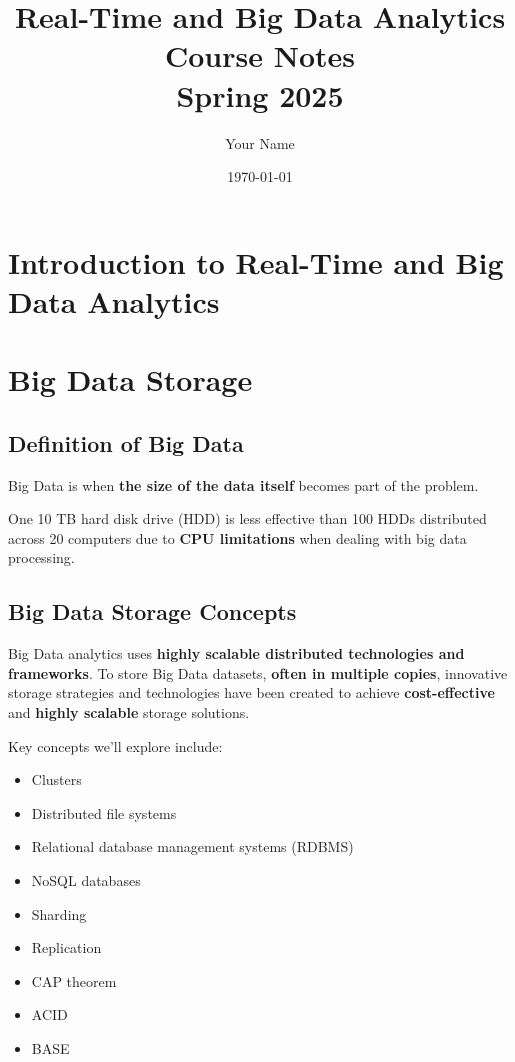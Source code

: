 \documentclass[12pt,a4paper]{report}
\title{
  \Huge{\textbf{Real-Time and Big Data Analytics}} \\
  \vspace{0.5cm}
  \Large{Course Notes} \\
  \vspace{0.5cm}
  \large{Spring 2025}
}
\author{Your Name}
\date{\today}
\begin{document}
\maketitle
\tableofcontents

\chapter{Introduction to Real-Time and Big Data Analytics}

\chapter{Big Data Storage}
\section{Definition of Big Data}
Big Data is when \textbf{the size of the data itself} becomes part of the problem.

\begin{keyconcept}
One 10 TB hard disk drive (HDD) is less effective than 100 HDDs distributed across 20 computers due to \textbf{CPU limitations} when dealing with big data processing.
\end{keyconcept}

\section{Big Data Storage Concepts}
Big Data analytics uses \textbf{highly scalable distributed technologies and frameworks}. To store Big Data datasets, \textbf{often in multiple copies}, innovative storage strategies and technologies have been created to achieve \textbf{cost-effective} and \textbf{highly scalable} storage solutions.

Key concepts we'll explore include:
\begin{itemize}
  \item Clusters
  \item Distributed file systems
  \item Relational database management systems (RDBMS)
  \item NoSQL databases
  \item Sharding
  \item Replication
  \item CAP theorem
  \item ACID
  \item BASE
\end{itemize}
\end{document}

